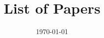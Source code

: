 \documentclass[12pt]{article}
\title{List of Papers}
\author{}
\date{\today}
\begin{document}
\maketitle

\begin{refsection}
    \nocite{john2025deep}  %
    \nocite{jiang2025tokenefficientlongvideounderstanding}
    \printbibliography[heading=subbibliography, title={2025}]
\end{refsection}

\begin{refsection}
    \nocite{alice2024transformer}  %
    \nocite{openai2024gpt4technicalreport}
    \printbibliography[heading=subbibliography, title={2024}]
\end{refsection}
\end{document}
